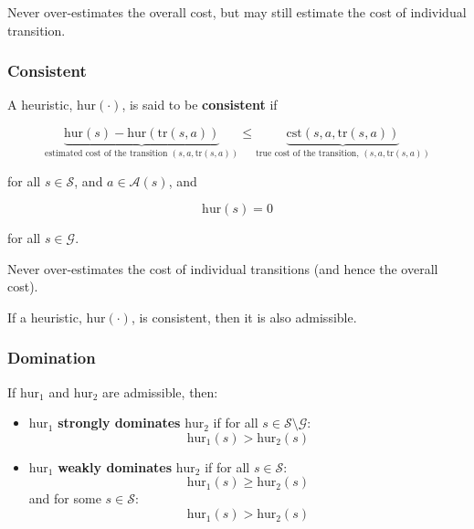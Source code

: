 \begin{warning}
    Never over-estimates the overall cost, but may still estimate the cost of individual transition. 
\end{warning}

\subsubsection{Consistent}
\begin{definition}
    A heuristic, $\text{hur}(\cdot)$, is said to be \textbf{consistent} if

    \begin{equation*}
        \underbrace{\text{hur}(s) - \text{hur}(\text{tr}(s,a))}_{\text{estimated cost of the transition }(s,a,\text{tr}(s,a))}
        \leq 
        \underbrace{\text{cst}(s,a,\text{tr}(s,a))}_{\text{true cost of the transition, }(s,a,\text{tr}(s,a))}
    \end{equation*}

    for all $s \in \mathcal{S}$, and $a \in \mathcal{A}(s)$, and

    \begin{equation*}
        \text{hur}(s) = 0
    \end{equation*}

    for all $s \in \mathcal{G}$.
\end{definition}

\begin{warning}
    Never over-estimates the cost of individual transitions (and hence the overall cost).
\end{warning}

\begin{theorem}
    If a heuristic, $\text{hur}(\cdot)$, is consistent, then it is also admissible.
\end{theorem}
\newpage

\subsubsection{Domination}
\begin{definition}
    If $\text{hur}_1$ and $\text{hur}_2$ are admissible, then:
    \begin{itemize}
        \item $\text{hur}_1$ \textbf{strongly dominates} $\text{hur}_2$ if for all $s \in \mathcal{S} \setminus \mathcal{G}$:
        \begin{equation*}
            \text{hur}_1(s) > \text{hur}_2(s)
        \end{equation*}

        \item $\text{hur}_1$ \textbf{weakly dominates} $\text{hur}_2$ if for all $s \in \mathcal{S}$:
        \begin{equation*}
            \text{hur}_1(s) \geq \text{hur}_2(s)
        \end{equation*}
        and for some $s \in \mathcal{S}$:
        \begin{equation*}
            \text{hur}_1(s) > \text{hur}_2(s)
        \end{equation*}
    \end{itemize}
\end{definition}

